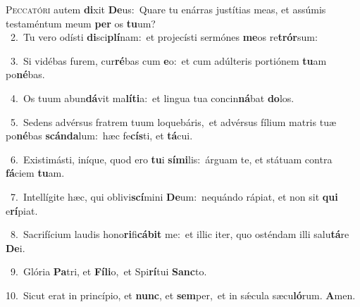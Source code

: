 \lettrine{\initial\textcolor{\initialcolor}{P}}{eccatóri} autem \textbf{di}\-xit \textbf{De}\-us:~\star Quare tu enárras justítias meas, et assúmis testaméntum meum \textbf{per} os \textbf{tu}\-um?\\
{\numbfont\textcolor{\numbcolor}{~2.}}~Tu vero odísti \textbf{di}\-sci\-\textbf{plí}\-nam:~\star et projecísti sermónes \textbf{me}\-os re\-\textbf{trór}\-sum:\par
{\numbfont\textcolor{\numbcolor}{~3.}}~Si vidébas furem, cur\-\textbf{ré}\-bas cum \textbf{e}\-o:~\star et cum adúlteris portiónem \textbf{tu}\-am po\-\textbf{né}\-bas.\par
{\numbfont\textcolor{\numbcolor}{~4.}}~Os tuum abun\-\textbf{dá}\-vit ma\-\textbf{lí}\-\textbf{ti}a:~\star et lingua tua concin\-\textbf{ná}\-bat \textbf{do}\-los.\par
{\numbfont\textcolor{\numbcolor}{~5.}}~Sedens advérsus fratrem tuum loquebáris,~\dagger et advérsus fílium matris tuæ po\-\textbf{né}\-bas \textbf{scán}\-\textbf{da}lum:~\star hæc fe\-\textbf{cís}\-ti, et \textbf{tá}\-cui.\par
{\numbfont\textcolor{\numbcolor}{~6.}}~Existimásti, iníque, quod ero \textbf{tu}\-i \textbf{sí}\-\textbf{mi}lis:~\star árguam te, et státuam contra \textbf{fá}\-ciem \textbf{tu}\-am.\par
{\numbfont\textcolor{\numbcolor}{~7.}}~Intellígite hæc, qui oblivi\-\textbf{scí}\-mini \textbf{De}\-um:~\star nequándo rápiat, et non sit \textbf{qui} e\-\textbf{rí}\-piat.\par
{\numbfont\textcolor{\numbcolor}{~8.}}~Sacrifícium laudis hono\-\textbf{ri}\-fi\-\textbf{cá}\-\textbf{bit} me:~\star et illic iter, quo osténdam illi salu\-\textbf{tá}\-re \textbf{De}\-i.\par
{\numbfont\textcolor{\numbcolor}{~9.}}~Glória \textbf{Pa}\-tri, et \textbf{Fí}\-\textbf{li}o,~\star et Spi\-\textbf{rí}\-tui \textbf{Sanc}\-to.\par
{\numbfont\textcolor{\numbcolor}{10.}}~Sicut erat in princípio, et \textbf{nunc}\-, et \textbf{sem}\-per,~\star et in sǽcula sæcu\-\textbf{ló}\-rum. \textbf{A}\-men.\par

